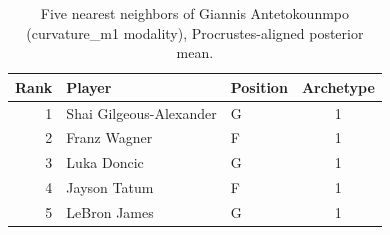 \begin{table}[htbp]
  \centering\small
  \begin{tabular}{rllc}
    \toprule
    Rank & Player & Position & Archetype \\
    \midrule
    1 & Shai Gilgeous-Alexander & G & 1 \\
    2 & Franz Wagner & F & 1 \\
    3 & Luka Doncic & G & 1 \\
    4 & Jayson Tatum & F & 1 \\
    5 & LeBron James & G & 1 \\
    \bottomrule
  \end{tabular}
  \caption{Five nearest neighbors of Giannis Antetokounmpo (curvature_m1 modality), Procrustes-aligned posterior mean.}
  \label{tab:Giannis_Antetokounmpo_neighbors_curvature_m1}
\end{table}

